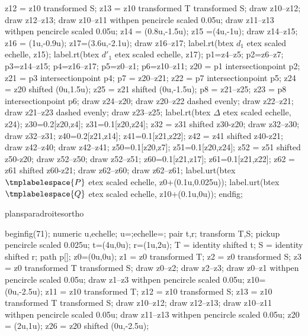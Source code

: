 {{{\begin{mplibcode}[PfLAO]
				z12 = z10 transformed S;
				z13 = z10 transformed T transformed S;
				draw z10--z12;
				draw z12--z13;
				draw z10--z11 withpen pencircle scaled 0.05u;
				draw z11--z13 withpen pencircle scaled 0.05u;
				z14 = (0.8u,-1.5u);
				z15 =(4u,-1u);
				draw z14--z15;
				z16 = (1u,-0.9u);
				z17=(3.6u,-2.1u);
				draw z16--z17;
				label.rt(btex $d_{1}$ etex scaled echelle, z15);
				label.rt(btex $d'_{1}$ etex scaled echelle, z17);
				p1=z4--z5;
				p2=z6--z7;
				p3=z14--z15;
				p4=z16--z17;
				p5=z0--z1;
				p6=z10--z11;
				z20 = p1 intersectionpoint p2;
				z21 = p3 intersectionpoint p4;
				p7 = z20--z21;
				z22 = p7 intersectionpoint p5;
				z24 = z20 shifted (0u,1.5u);
				z25 = z21 shifted (0u,-1.5u);
				p8 = z21--z25;
				z23 = p8 intersectionpoint p6;
				draw z24--z20;
				draw z20--z22 dashed evenly;
				draw z22--z21; 
				draw z21--z23 
				dashed evenly;
				draw z23--z25;
				label.rt(btex $\Delta$ etex scaled echelle, z24);
				z30=0.2[z20,z4];
				z31=0.1[z20,z24];
				z32 = z31 shifted z30-z20;
				draw z32--z30;
				draw z32--z31;
				z40=0.2[z21,z14];
				z41=0.1[z21,z22];
				z42 = z41 shifted z40-z21;
				draw z42--z40;
				draw z42--z41;
				z50=0.1[z20,z7];
				z51=0.1[z20,z24];
				z52 = z51 shifted z50-z20;
				draw z52--z50;
				draw z52--z51;
				z60=0.1[z21,z17];
				z61=0.1[z21,z22];
				z62 = z61 shifted z60-z21;
				draw z62--z60;
				draw z62--z61;
				label.urt(btex $\tmplabelespace{P}$ etex scaled echelle, z0+(0.1u,0.025u));
				label.urt(btex $\tmplabelespace{Q}$ etex scaled echelle, z10+(0.1u,0u));
				endfig;
			\end{mplibcode}
		}%
		{plansparadroitesortho}{%
			\begin{mplibcode}[PfLAP]
				beginfig(71);
				numeric u,echelle;
				u=\scaleminischemspace*1cm;echelle=\scaleminischemspace;
				pair t,r;
				transform T,S;
				pickup pencircle scaled 0.025u;
				t=(4u,0u); r=(1u,2u);
				T = identity shifted t;
				S = identity shifted r;
				path p[];
				z0=(0u,0u);
				z1 = z0 transformed T;
				z2 = z0 transformed S;
				z3 = z0 transformed T transformed S;
				draw z0--z2;
				draw z2--z3;
				draw z0--z1 withpen pencircle scaled 0.05u;
				draw z1--z3 withpen pencircle scaled 0.05u;
				z10=(0u,-2.5u);
				z11 = z10 transformed T;
				z12 = z10 transformed S;
				z13 = z10 transformed T transformed S;
				draw z10--z12;
				draw z12--z13;
				draw z10--z11 withpen pencircle scaled 0.05u;
				draw z11--z13 withpen pencircle scaled 0.05u;
				z20 = (2u,1u);
				z26 = z20 shifted (0u,-2.5u);

\end{mplibcode}}}}
